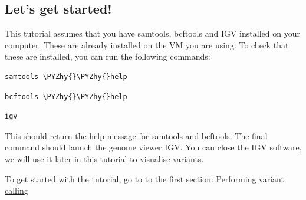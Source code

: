 \documentclass[11pt]{article}
\makeatletter
\def\PYZhy{\char`\-}
\newcommand{\boxspacing}{\kern\kvtcb@left@rule\kern\kvtcb@boxsep}
\newcommand{\prompt}[4]{

        {\ttfamily\llap{{\color{blue}\LARGE\faKeyboardO\hspace{3pt}#4}}\vspace{-\baselineskip}}
    }
\makeatother
\begin{document}
\hypertarget{lets-get-started}{%
\subsection{Let's get started!}\label{lets-get-started}}

This tutorial assumes that you have samtools, bcftools and IGV installed
on your computer. These are already installed on the VM you are using.
To check that these are installed, you can run the following commands:

    \begin{tcolorbox}[breakable, size=fbox, boxrule=1pt, pad at break*=1mm,colback=cellbackground, colframe=cellborder]
\prompt{In}{incolor}{ }{\boxspacing}
\begin{Verbatim}[commandchars=\\\{\}]
samtools \PYZhy{}\PYZhy{}help
\end{Verbatim}
\end{tcolorbox}

    \begin{tcolorbox}[breakable, size=fbox, boxrule=1pt, pad at break*=1mm,colback=cellbackground, colframe=cellborder]
\prompt{In}{incolor}{ }{\boxspacing}
\begin{Verbatim}[commandchars=\\\{\}]
bcftools \PYZhy{}\PYZhy{}help
\end{Verbatim}
\end{tcolorbox}

    \begin{tcolorbox}[breakable, size=fbox, boxrule=1pt, pad at break*=1mm,colback=cellbackground, colframe=cellborder]
\prompt{In}{incolor}{ }{\boxspacing}
\begin{Verbatim}[commandchars=\\\{\}]
igv
\end{Verbatim}
\end{tcolorbox}

    This should return the help message for samtools and bcftools. The final
command should launch the genome viewer IGV. You can close the IGV
software, we will use it later in this tutorial to visualise variants.

To get started with the tutorial, go to to the first section:
\href{variant-calling.ipynb}{Performing variant calling}





\newpage
\end{document}
